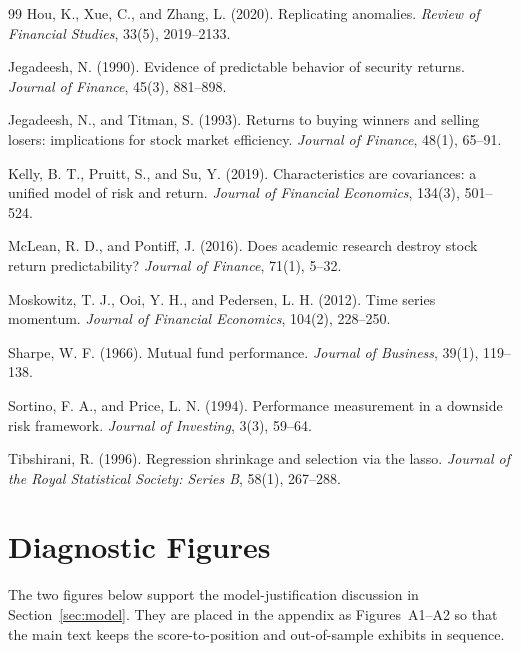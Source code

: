 \documentclass[11pt,a4paper]{article}
\begin{document}
\begin{thebibliography}{99}
Hou, K., Xue, C., and Zhang, L. (2020).
Replicating anomalies.
\textit{Review of Financial Studies}, 33(5), 2019--2133.

Jegadeesh, N. (1990).
Evidence of predictable behavior of security returns.
\textit{Journal of Finance}, 45(3), 881--898.

Jegadeesh, N., and Titman, S. (1993).
Returns to buying winners and selling losers: implications for stock market efficiency.
\textit{Journal of Finance}, 48(1), 65--91.

Kelly, B. T., Pruitt, S., and Su, Y. (2019).
Characteristics are covariances: a unified model of risk and return.
\textit{Journal of Financial Economics}, 134(3), 501--524.

McLean, R. D., and Pontiff, J. (2016).
Does academic research destroy stock return predictability?
\textit{Journal of Finance}, 71(1), 5--32.

Moskowitz, T. J., Ooi, Y. H., and Pedersen, L. H. (2012).
Time series momentum.
\textit{Journal of Financial Economics}, 104(2), 228--250.

Sharpe, W. F. (1966).
Mutual fund performance.
\textit{Journal of Business}, 39(1), 119--138.

Sortino, F. A., and Price, L. N. (1994).
Performance measurement in a downside risk framework.
\textit{Journal of Investing}, 3(3), 59--64.

Tibshirani, R. (1996).
Regression shrinkage and selection via the lasso.
\textit{Journal of the Royal Statistical Society: Series B}, 58(1), 267--288.

\end{thebibliography}

\appendix
\section{Diagnostic Figures}
\label{app:diagnostics}
\setcounter{figure}{0}
\renewcommand{\thefigure}{A\arabic{figure}}

The two figures below support the model-justification discussion in Section~\ref{sec:model}. They are placed in the appendix as Figures~A1--A2 so that the main text keeps the score-to-position and out-of-sample exhibits in sequence.
\end{document}
